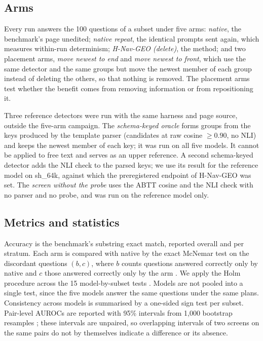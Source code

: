 \documentclass[journal=jcisd8,manuscript=article]{achemso}
\newcommand{\sub}[1]{\textsf{sh\_#1}}                    %
\newcommand{\geo}{H-Nav-GEO}
\begin{document}
\subsection{Arms}
\label{sec:arms}

Every run answers the 100 questions of a subset under five arms: \emph{native}, the benchmark's page unedited; \emph{native repeat}, the identical prompts sent again, which measures within-run determinism; \emph{\geo{} (delete)}, the method; and two placement arms, \emph{move newest to end} and \emph{move newest to front}, which use the same detector and the same groups but move the newest member of each group instead of deleting the others, so that nothing is removed. The placement arms test whether the benefit comes from removing information or from repositioning it.

Three reference detectors were run with the same harness and page source, outside the five-arm campaign. The \emph{schema-keyed oracle} forms groups from the keys produced by the template parser (candidates at raw cosine $\ge0.90$, no NLI) and keeps the newest member of each key; it was run on all five models. It cannot be applied to free text and serves as an upper reference. A second schema-keyed detector adds the NLI check to the parsed keys; we use its result for the reference model on \sub{64k}, against which the preregistered endpoint of \geo{} was set. The \emph{screen without the probe} uses the ABTT cosine and the NLI check with no parser and no probe, and was run on the reference model only.

\subsection{Metrics and statistics}
\label{sec:stats}

Accuracy is the benchmark's substring exact match, reported overall and per stratum. Each arm is compared with native by the exact McNemar test on the discordant questions $(b,c)$, where $b$ counts questions answered correctly only by native and $c$ those answered correctly only by the arm \cite{mcnemar1947}. We apply the Holm procedure across the 15 model-by-subset tests \cite{holm1979}. Models are not pooled into a single test, since the five models answer the same questions under the same plans. Consistency across models is summarised by a one-sided sign test per subset. Pair-level AUROCs are reported with 95\% intervals from 1,000 bootstrap resamples \cite{efron1993bootstrap}; these intervals are unpaired, so overlapping intervals of two screens on the same pairs do not by themselves indicate a difference or its absence.
\end{document}
